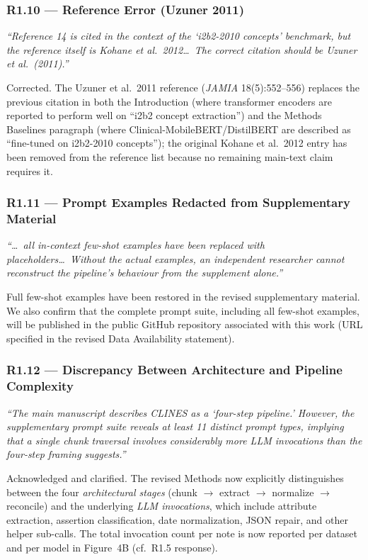 \documentclass[11pt,letterpaper]{article}
\newcommand{\reviewer}[1]{\par\medskip\textcolor{blue!75!black}{\textit{#1}}\par\medskip}
\newcommand{\response}[1]{\par#1\par\medskip}
\begin{document}
\subsubsection*{R1.10 --- Reference Error (Uzuner 2011)}
\reviewer{``Reference 14 is cited in the context of the `i2b2-2010 concepts' benchmark, but the reference itself is Kohane et al.\ 2012\dots\ The correct citation should be Uzuner et al.\ (2011).''}
\response{Corrected. The Uzuner et al.\ 2011 reference (\textit{JAMIA} 18(5):552--556) replaces the previous citation in both the Introduction (where transformer encoders are reported to perform well on ``i2b2 concept extraction'') and the Methods Baselines paragraph (where Clinical-MobileBERT/DistilBERT are described as ``fine-tuned on i2b2-2010 concepts''); the original Kohane et al.\ 2012 entry has been removed from the reference list because no remaining main-text claim requires it.}

\subsubsection*{R1.11 --- Prompt Examples Redacted from Supplementary Material}
\reviewer{``\dots\ all in-context few-shot examples have been replaced with placeholders\dots\ Without the actual examples, an independent researcher cannot reconstruct the pipeline's behaviour from the supplement alone.''}
\response{Full few-shot examples have been restored in the revised supplementary material. We also confirm that the complete prompt suite, including all few-shot examples, will be published in the public GitHub repository associated with this work (URL specified in the revised Data Availability statement).}

\subsubsection*{R1.12 --- Discrepancy Between Architecture and Pipeline Complexity}
\reviewer{``The main manuscript describes CLINES as a `four-step pipeline.' However, the supplementary prompt suite reveals at least 11 distinct prompt types, implying that a single chunk traversal involves considerably more LLM invocations than the four-step framing suggests.''}
\response{Acknowledged and clarified. The revised Methods now explicitly distinguishes between the four \emph{architectural stages} (chunk $\rightarrow$ extract $\rightarrow$ normalize $\rightarrow$ reconcile) and the underlying \emph{LLM invocations}, which include attribute extraction, assertion classification, date normalization, JSON repair, and other helper sub-calls. The total invocation count per note is now reported per dataset and per model in Figure~4B (cf.\ R1.5 response).}
\end{document}
